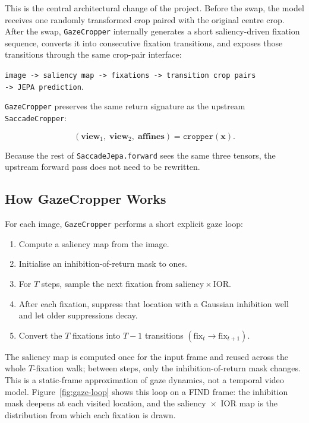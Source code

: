 \documentclass[12pt,a4paper]{article}
\begin{document}
This is the central architectural change of the project. Before the swap, the
model receives one randomly transformed crop paired with the original centre
crop. After the swap, \texttt{GazeCropper} internally generates a short
saliency-driven fixation sequence, converts it into consecutive fixation
transitions, and exposes those transitions through the same crop-pair interface:

\begin{center}
\texttt{image -> saliency map -> fixations -> transition crop pairs}\\
\texttt{-> JEPA prediction}.
\end{center}

\texttt{GazeCropper} preserves the same return signature as the upstream
\texttt{SaccadeCropper}:

\begin{equation}
  (\mathbf{view}_1,\; \mathbf{view}_2,\; \mathbf{affines})
  = \texttt{cropper}(\mathbf{x}).
  \label{eq:gaze-cropper-return}
\end{equation}

Because the rest of \texttt{SaccadeJepa.forward} sees the same three tensors,
the upstream forward pass does not need to be rewritten.

\subsection{How GazeCropper Works}
\label{subsec:saccade-generation}

For each image, \texttt{GazeCropper} performs a short explicit gaze loop:

\begin{enumerate}
  \item Compute a saliency map from the image.
  \item Initialise an inhibition-of-return mask to ones.
  \item For $T$ steps, sample the next fixation from
        $\mathrm{saliency} \times \mathrm{IOR}$.
  \item After each fixation, suppress that location with a Gaussian inhibition
        well and let older suppressions decay.
  \item Convert the $T$ fixations into $T-1$ transitions
        $(\mathrm{fix}_t \to \mathrm{fix}_{t+1})$.
\end{enumerate}

The saliency map is computed once for the input frame and reused across the
whole $T$-fixation walk; between steps, only the inhibition-of-return mask
changes. This is a static-frame approximation of gaze dynamics, not a temporal
video model. Figure~\ref{fig:gaze-loop} shows this loop on a FIND frame: the
inhibition mask deepens at each visited location, and the saliency~$\times$~IOR
map is the distribution from which each fixation is drawn.
\end{document}
